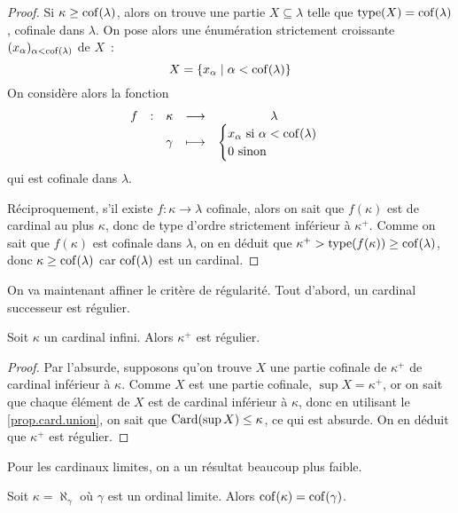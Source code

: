 \begin{proof}
  Si $\kappa \geq \operatorname{cof}(\lambda)$, alors on trouve une partie $X\subseteq\lambda$
  telle que $\operatorname{type}(X)=\operatorname{cof}(\lambda)$, cofinale dans $\lambda$. On pose alors
  une énumération strictement croissante $(x_\alpha)_{\alpha < \operatorname{cof}(\lambda)}$ de
  $X$~:
  \[X = \{x_\alpha\mid \alpha < \operatorname{cof}(\lambda)\}\]
  On considère alors la fonction
  \[\begin{array}{ccccc}
  f & : & \kappa & \longrightarrow & \lambda\\
  & & \gamma & \longmapsto &
  \begin{cases}
  x_\alpha \text{ si } \alpha < \operatorname{cof}(\lambda)\\
  0 \text{ sinon}
  \end{cases}
  \end{array}\]
  qui est cofinale dans $\lambda$.

  Réciproquement, s'il existe $f : \kappa \to \lambda$ cofinale, alors on sait
  que $f(\kappa)$ est de cardinal au plus $\kappa$, donc de type d'ordre
  strictement inférieur à $\kappa^+$. Comme on sait que $f(\kappa)$ est
  cofinale dans $\lambda$, on en déduit que
  $\kappa^+ > \operatorname{type}(f(\kappa)) \geq \operatorname{cof}(\lambda)$, donc
  $\kappa \geq \operatorname{cof}(\lambda)$ car $\operatorname{cof}(\lambda)$ est un cardinal.
\end{proof}

On va maintenant affiner le critère de régularité. Tout d'abord, un cardinal
successeur est régulier.

\begin{theorem}
  Soit $\kappa$ un cardinal infini. Alors $\kappa^+$ est régulier.
\end{theorem}

\begin{proof}
  Par l'absurde, supposons qu'on trouve $X$ une partie cofinale de $\kappa^+$
  de cardinal inférieur à $\kappa$. Comme $X$ est une partie cofinale,
  $\sup X = \kappa^+$, or on sait que chaque élément de $X$ est de cardinal
  inférieur à $\kappa$, donc en utilisant le \cref{prop.card.union}, on sait
  que $\operatorname{Card}(\sup X) \leq \kappa$, ce qui est absurde. On en déduit que
  $\kappa^+$ est régulier.
\end{proof}

Pour les cardinaux limites, on a un résultat beaucoup plus faible.

\begin{proposition}
  Soit $\kappa = \aleph_\gamma$ où $\gamma$ est un ordinal limite. Alors
  $\operatorname{cof}(\kappa) = \operatorname{cof}(\gamma)$.
\end{proposition}

